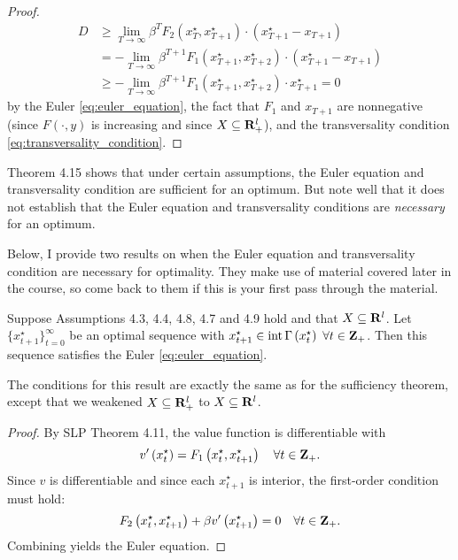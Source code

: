 \documentclass[11pt,letterpaper,reqno,oneside]{article}
\begin{document}
\begin{proof}
	\begin{align*}
		D &\geq \lim_{T \to \infty} \beta^T
		F_2 \left( x_T^\star, x_{T+1}^\star \right) 
		\cdot \left( x_{T+1}^\star - x_{T+1} \right)
		\\
		&= - \lim_{T \to \infty} \beta^{T+1}
		F_1 \left( x_{T+1}^\star, x_{T+2}^\star \right) 
		\cdot \left( x_{T+1}^\star - x_{T+1} \right)
		\\
		&\geq - \lim_{T \to \infty} \beta^{T+1}
		F_1 \left( x_{T+1}^\star, x_{T+2}^\star \right) 
		\cdot x_{T+1}^\star
		= 0 
	\end{align*}
	by the Euler \cref{eq:euler_equation}, the fact that $F_1$ and $x_{T+1}$ are nonnegative (since $F(\cdot,y)$ is increasing and since $X \subseteq \mathbf{R}^l_+$), and the transversality condition \eqref{eq:transversality_condition}.
\end{proof}

Theorem 4.15 shows that under certain assumptions, the Euler equation and transversality condition are sufficient for an optimum. But note well that it does not establish that the Euler equation and transversality conditions are \emph{necessary} for an optimum.

Below, I provide two results on when the Euler equation and transversality condition are necessary for optimality. They make use of material covered later in the course, so come back to them if this is your first pass through the material.

\begin{proposition}
	Suppose Assumptions 4.3, 4.4, 4.8, 4.7 and 4.9 hold and that $X \subseteq \mathbf{R}^l$. Let $\{ x^\star_{t+1} \}_{t=0}^\infty$ be an optimal sequence with $x^\star_{t+1} \in \operatorname*{int}{ \Gamma \left( x^\star_t \right) }$ $\forall t \in \mathbf{Z}_+$. Then this sequence satisfies the Euler \cref{eq:euler_equation}.
\end{proposition}

The conditions for this result are exactly the same as for the sufficiency theorem, except that we weakened $X \subseteq \mathbf{R}_+^l$ to $X \subseteq \mathbf{R}^l$.

\begin{proof}
	By SLP Theorem 4.11, the value function is differentiable with
	\begin{equation*}
		v'\left( x^\star_t \right)
		= F_1\left( x^\star_t, x^\star_{t+1} \right)
		\quad\forall t \in \mathbf{Z}_+ .
	\end{equation*}
	Since $v$ is differentiable and since each $x^\star_{t+1}$ is interior, the first-order condition must hold:
	\begin{equation*}
		F_2\left( x^\star_t, x^\star_{t+1} \right) 
		+ \beta v'\left( x^\star_{t+1} \right) = 0  
		\quad\forall t \in \mathbf{Z}_+ .
	\end{equation*}
	Combining yields the Euler equation.
\end{proof}
\end{document}
